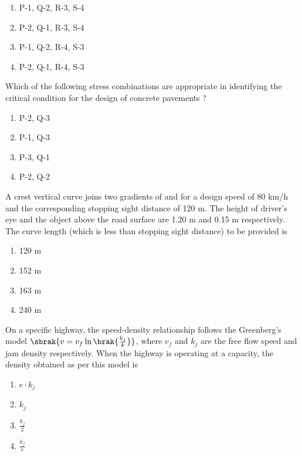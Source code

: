 \begin{table}[h!]
  \centering
  
\end{table} 
 \begin{enumerate}
     \item P-1, Q-2, R-3, S-4
     \item P-2, Q-1, R-3, S-4
     \item P-1, Q-2, R-4, S-3
     \item P-2, Q-1, R-4, S-3 \\
 \end{enumerate}
\item Which of the following stress combinations are appropriate in identifying the critical condition for the design of concrete pavements ?
\begin{table}[h!]
  \centering
  
\end{table} 
\begin{enumerate}
     \item P-2, Q-3
     \item P-1, Q-3
     \item P-3, Q-1
     \item P-2, Q-2 \\
 \end{enumerate}
\item A crest vertical curve joins two gradients of  and  for a design speed of 80 km/h and the corresponding stopping sight distance of 120 m. The height of driver's eye and the object above the road surface are 1.20 m and 0.15 m respectively. The curve length (which is less than stopping sight distance) to be provided is
\begin{enumerate}
    \item 120 m
    \item 152 m
    \item 163 m
    \item 240 m \\
\end{enumerate}
\item On a specific highway, the speed-density relationship follows the Greenberg's model $\sbrak{v = v_f \ln{\brak{\frac{k_j}{k}}}}$, where $v_f$ and $k_j$ are the free flow speed and jam density respectively. When the highway is operating at a capacity, the density obtained as per this model is
\begin{enumerate}
    \item $e \cdot k_j$
    \item $k_j$
    \item $\frac{k_j}{2}$
    \item $\frac{k_j}{e}$ \\
\end{enumerate}
